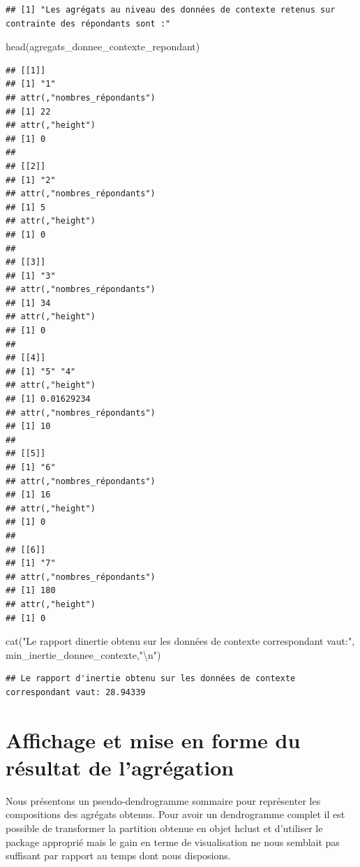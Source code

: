\documentclass[
]{article}
\newenvironment{Shaded}{\begin{snugshade}}{\end{snugshade}}
\newcommand{\FunctionTok}[1]{\textcolor[rgb]{0.00,0.00,0.00}{#1}}
\newcommand{\NormalTok}[1]{#1}
\newcommand{\SpecialCharTok}[1]{\textcolor[rgb]{0.00,0.00,0.00}{#1}}
\newcommand{\StringTok}[1]{\textcolor[rgb]{0.31,0.60,0.02}{#1}}
\begin{document}
\begin{verbatim}
## [1] "Les agrégats au niveau des données de contexte retenus sur contrainte des répondants sont :"
\end{verbatim}

\begin{Shaded}
\begin{Highlighting}[]
\FunctionTok{head}\NormalTok{(agregats\_donnee\_contexte\_repondant)}
\end{Highlighting}
\end{Shaded}

\begin{verbatim}
## [[1]]
## [1] "1"
## attr(,"nombres_répondants")
## [1] 22
## attr(,"height")
## [1] 0
## 
## [[2]]
## [1] "2"
## attr(,"nombres_répondants")
## [1] 5
## attr(,"height")
## [1] 0
## 
## [[3]]
## [1] "3"
## attr(,"nombres_répondants")
## [1] 34
## attr(,"height")
## [1] 0
## 
## [[4]]
## [1] "5" "4"
## attr(,"height")
## [1] 0.01629234
## attr(,"nombres_répondants")
## [1] 10
## 
## [[5]]
## [1] "6"
## attr(,"nombres_répondants")
## [1] 16
## attr(,"height")
## [1] 0
## 
## [[6]]
## [1] "7"
## attr(,"nombres_répondants")
## [1] 180
## attr(,"height")
## [1] 0
\end{verbatim}

\begin{Shaded}
\begin{Highlighting}[]
\FunctionTok{cat}\NormalTok{(}\StringTok{"Le rapport d\textquotesingle{}inertie obtenu sur les données de contexte correspondant vaut:"}\NormalTok{, min\_inertie\_donnee\_contexte,}\StringTok{"}\SpecialCharTok{\textbackslash{}n}\StringTok{"}\NormalTok{)}
\end{Highlighting}
\end{Shaded}

\begin{verbatim}
## Le rapport d'inertie obtenu sur les données de contexte correspondant vaut: 28.94339
\end{verbatim}

\hypertarget{affichage-et-mise-en-forme-du-ruxe9sultat-de-lagruxe9gation}{%
\section{Affichage et mise en forme du résultat de
l'agrégation}\label{affichage-et-mise-en-forme-du-ruxe9sultat-de-lagruxe9gation}}

Nous présentons un pseudo-dendrogramme sommaire pour représenter les
compositions des agrégats obtenus. Pour avoir un dendrogramme complet il
est possible de transformer la partition obtenue en objet hclust et
d'utiliser le package approprié mais le gain en terme de visualisation
ne nous semblait pas suffisant par rapport au temps dont nous
disposions.
\end{document}

